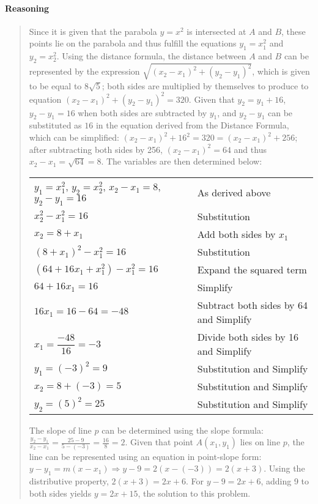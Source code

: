 \documentclass[letterpaper,12pt,twoside]{report}
\begin{document}
	\paragraph{Reasoning}
	\begin{quotation}
		
		Since it is given that the parabola $y=x^2$ is intersected at $A$ and $B$, these points lie on the parabola and thus fulfill the equations $y_1=x_1^2$ and $y_2=x_2^2$. Using the distance formula, the distance between $A$ and $B$ can be represented by the expression $\sqrt{(x_2-x_1)^2+(y_2-y_1)^2}$, which is given to be equal to $8\sqrt{5}$; both sides are multiplied by themselves to produce to equation $(x_2-x_1)^2+(y_2-y_1)^2=320$. Given that $y_2=y_1+16$, $y_2-y_1=16$ when both sides are subtracted by $y_1$, and $y_2-y_1$ can be substituted as $16$ in the equation derived from the Distance Formula, which can be simplified: $(x_2-x_1)^2+16^2=320=(x_2-x_1)^2+256$; after subtracting both sides by 256, $(x_2-x_1)^2=64$ and thus $x_2-x_1=\sqrt{64}=8$. The variables are then determined below:
		\begin{center}
			\begin{tabular}{l | l}
				$y_1=x_1^2$, $y_2=x_2^2$, $x_2-x_1=8$, $y_2-y_1=16$ & As derived above \\
				$x_2^2-x_1^2=16$ & Substitution \\
				$x_2=8+x_1$ & Add both sides by $x_1$ \\
				$(8+x_1)^2-x_1^2=16$ & Substitution \\
				$(64+16x_1+x_1^2)-x_1^2=16$ & Expand the squared term \\
				$64+16x_1=16$ & Simplify \\
				$16x_1=16-64=-48$ & Subtract both sides by 64 and Simplify \\
				$x_1=\dfrac{-48}{16}=-3$ & Divide both sides by 16 and Simplify \\
				$y_1=(-3)^2=9$ & Substitution and Simplify \\
				$x_2=8+(-3)=5$ & Substitution and Simplify \\
				$y_2=(5)^2=25$ & Substitution and Simplify
			\end{tabular}
		\end{center}
	
		The slope of line $p$ can be determined using the slope formula: $\frac{y_2-y_1}{x_2-x_1}=\frac{25-9}{5-(-3)}=\frac{16}{8}=2$. Given that point $A(x_1,y_1)$ lies on line $p$, the line can be represented using an equation in point-slope form: $y-y_1=m(x-x_1) \Rightarrow y-9=2(x-(-3))=2(x+3)$. Using the distributive property, $2(x+3)=2x+6$. For $y-9=2x+6$, adding 9 to both sides yields $\boxed{y=2x+15}$, the solution to this problem.
	\end{quotation}
	
\end{document}
